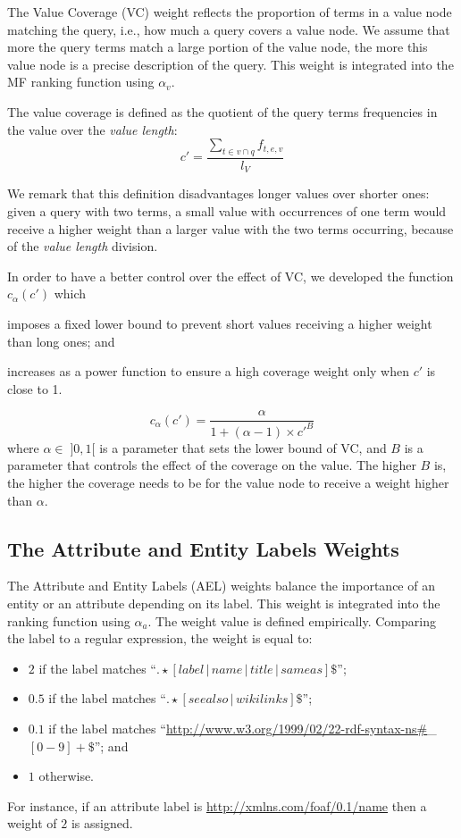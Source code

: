 The Value Coverage (VC) weight reflects the proportion of terms in a value node matching the query, i.e., how much a query covers a value node. We assume that more the query terms match a large portion of the value node, the more this value node is a precise description of the query. This weight is integrated into the MF ranking function using $\alpha_v$.

The value coverage is defined as the quotient of the query terms frequencies in the value over the \emph{value length}: %
$$
c' = \frac{\sum_{t\in v \cap q}{f_{t,e,v}}}{l_V}
$$

We remark that this definition disadvantages longer values over shorter ones: given a query with two terms, a small value with occurrences of one term would receive a higher weight than a larger value with the two terms occurring, because of the \emph{value length} division.

In order to have a better control over the effect of VC, we developed the function $c_\alpha(c')$ which
\begin{inparaenum}[(1)]
  \item imposes a fixed lower bound to prevent short values receiving a higher weight than long ones; and
  \item increases as a power function to ensure a high coverage weight only when $c'$ is close to 1.
\end{inparaenum}
\begin{equation}
\label{eq:vc-norm}
c_\alpha(c') = \frac{\alpha}{1+(\alpha-1)\times c'^B}
\end{equation}
where $\alpha \in \; ]0,1[$ is a parameter that sets the lower bound of VC, and $B$ is a parameter that controls the effect of the coverage on the value. The higher $B$ is, the higher the coverage needs to be for the value node to receive a weight higher than $\alpha$.

\subsection{The Attribute and Entity Labels Weights}
\label{sec:att-subj-w}

The Attribute and Entity Labels (AEL) weights balance the importance of an entity or an attribute depending on its label. This weight is integrated into the ranking function using $\alpha_a$.
The weight value is defined empirically. Comparing the label to a regular expression, the weight is equal to:

\begin{itemize}
    \item $2$ if the label matches ``$.\star[label\,\vert\,name\,\vert\,title\,\vert\,sameas]\$$'';
    \item $0.5$ if the label matches ``$.\star[seealso\,\vert\,wikilinks]\$$'';
    \item $0.1$ if the label matches ``\url{http://www.w3.org/1999/02/22-rdf-syntax-ns\#}\_$[0-9]+\$$''; and
    \label{it:rdf:bag}
    \item $1$ otherwise.
\end{itemize}
For instance, if an attribute label is \url{http://xmlns.com/foaf/0.1/name} then a weight of $2$ is assigned.

